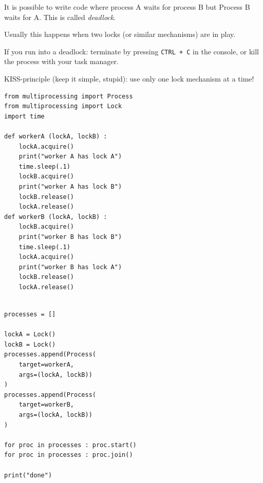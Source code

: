
\begin{frame}
%
\begin{warnbox}[Deadlocks]
It is possible to write code where process A waits for process B but Process B waits for A. This is called \emph{deadlock}.

\vspace{6pt}
Usually this happens when two locks (or similar mechanisms) are in play.

\vspace{6pt}
If you run into a deadlock: terminate by pressing \texttt{CTRL + C} in the console, or kill the process with your task manager.

\vspace{6pt}
\Thus KISS-principle (keep it simple, stupid): use only one lock mechanism at a time!
\end{warnbox}
%
\end{frame}


\begin{frame}[fragile]
%
\begin{tcbraster}[raster columns=2,
                  raster equal height,
                  nobeforeafter,
                  raster column skip=0.5cm]
\begin{codebox}
\begin{verbatim}
from multiprocessing import Process
from multiprocessing import Lock
import time

def workerA (lockA, lockB) :
    lockA.acquire()
    print("worker A has lock A")
    time.sleep(.1)
    lockB.acquire()
    print("worker A has lock B")
    lockB.release()
    lockA.release()
def workerB (lockA, lockB) :
    lockB.acquire()
    print("worker B has lock B")
    time.sleep(.1)
    lockA.acquire()
    print("worker B has lock A")
    lockB.release()
    lockA.release()
\end{verbatim}
\end{codebox}
%
\begin{codebox}[(... continued)]
\begin{verbatim}
    
processes = []

lockA = Lock()
lockB = Lock()
processes.append(Process(
    target=workerA,
    args=(lockA, lockB))
)
processes.append(Process(
    target=workerB,
    args=(lockA, lockB))
)

for proc in processes : proc.start()
for proc in processes : proc.join()

print("done")
\end{verbatim}
\end{codebox}
\end{tcbraster}
%
\end{frame}

